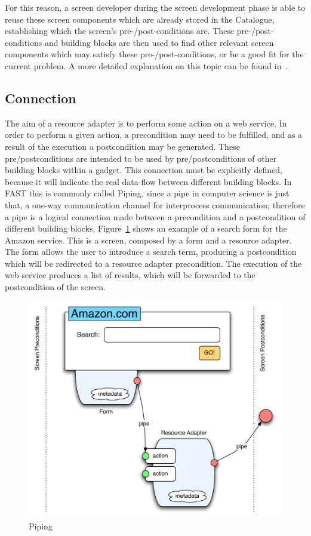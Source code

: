 \documentclass{fast_latex}
\begin{document}
For this reason, a screen developer during the screen development phase is able to reuse these screen components which are already stored in the Catalogue, establishing which the screen's pre-/post-conditions are. These pre-/post-conditions and building blocks are then used to find other relevant screen components which may satisfy these pre-/post-conditions, or be a good fit for the current problem. A more detailed explanation on this topic can be found in~\cite{rivera2011catalogue_user_manual}.


\subsection{Connection} %
\label{sub:connection}

The aim of a resource adapter is to perform some action on a web service. In order to perform a given action, a precondition may need to be fulfilled, and as a result of the execution a postcondition may be generated. These pre/postconditions are intended to be used by pre/postconditions of other building blocks within a gadget. This connection must be explicitly defined, because it will indicate the real data-flow between different building blocks. In FAST this is commonly called Piping, since a pipe in computer science is just that, a one-way communication channel for interprocess communication; therefore a pipe is a logical connection made between a precondition and a postcondition of different building blocks. Figure~\ref{fig:Piping} shows an example of a search form for the Amazon service. This is a screen, composed by a form and a resource adapter. The form allows the user to introduce a search term, producing a postcondition which will be redirected to a resource adapter precondition. The execution of the web service produces a list of results, which will be forwarded to the postcondition of the screen.

\begin{figure}[!htb]
  \begin{center}
    \includegraphics[width=12cm]{images/piping.pdf}
    \caption{Piping}
    \label{fig:Piping}
  \end{center}
\end{figure}
\end{document}
